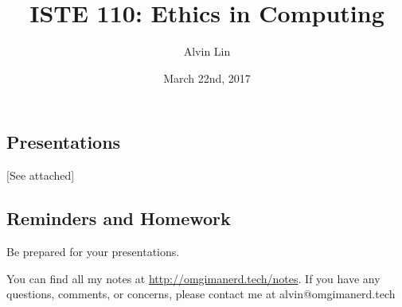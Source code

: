 \documentclass[letterpaper, 12pt]{article}
\title{ISTE 110: Ethics in Computing}
\author{Alvin Lin}
\date{March 22nd, 2017}
\begin{document}
\maketitle

\subsection*{Presentations}
[See attached]

\subsection*{Reminders and Homework}
Be prepared for your presentations.

\begin{center}
  You can find all my notes at \url{http://omgimanerd.tech/notes}. If you have
  any questions, comments, or concerns, please contact me at
  alvin@omgimanerd.tech
\end{center}
\end{document}
